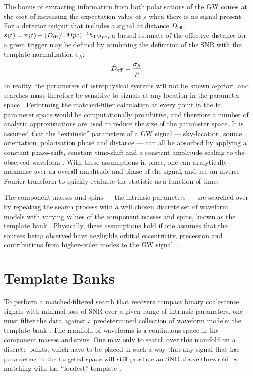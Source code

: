\documentclass[binding=0.6cm, LaM]{sapthesis}
\begin{document}
	The bonus of extracting information from both polarisations of the GW 
	comes at the cost of increasing the expectation value of $\rho$ when there is no signal present. 
	For a detector output that includes a signal at distance $D_{\rm eff}$, 
	$s(t) = n(t) + (D_{\rm eff}/1 Mpc)^{-1}h_{1Mpc}$, 
	a biased estimate of the effective distance for a given trigger 
	may be defined by combining the definition of the SNR with the template normalization $\sigma_h$:
        \begin{equation}
          \hat D_{\rm eff} = {{\sigma_h} \over {\rho}}
        \end{equation}
	In reality, the parameters of astrophysical systems will not be known a-priori, 
	and searches must therefore be sensitive to signals at any location in the parameter space \cite{25}. 
	Performing the matched-filter calculation at every point in the full parameter space 
	would be computationally prohibitive, 
	and therefore a number of analytic approximations are used to reduce the size of the parameter space. 
	It is assumed that the ``extrinsic'' parameters of a GW signal --- 
	sky-location, source orientation, polarisation phase and distance --- 
	can all be absorbed by applying a constant phase-shift, 
	constant time-shift and a constant amplitude scaling to the observed waveform \cite{27}. 
	With these assumptions in place, 
	one can analytically maximise over an overall amplitude and phase of the signal, 
	and use an inverse Fourier transform to quickly evaluate the statistic as a function of time.

	The component masses and spins --- the intrinsic parameters --- 
	are searched over by repeating the search process with a well chosen discrete set of waveform models 
	with varying values of the component masses and spins, 
	known as the template bank \cite{27}. 
	Physically, these assumptions hold if one assumes that the sources being observed 
	have negligible orbital eccentricity, precession and contributions from higher-order modes 
	to the GW signal \cite{23}. 

\section{Template Banks}
\label{sec:template_banks}
	To perform a matched-filtered search that recovers compact binary coalescence signals
	with minimal loss of SNR over a given range of intrinsic parameters, 
	one must filter the data against a predetermined collection of waveform models: the template bank \cite{28}.
	The manifold of waveforms is a continuous space in the component masses and spins. 
	One may only to search over this manifold on a discrete points, 
	which have to be placed in such a way that any signal
	that has parameters in the targeted space will still produce an SNR 
	above threshold by matching with the ``loudest'' template \cite{27}.
\end{document}

